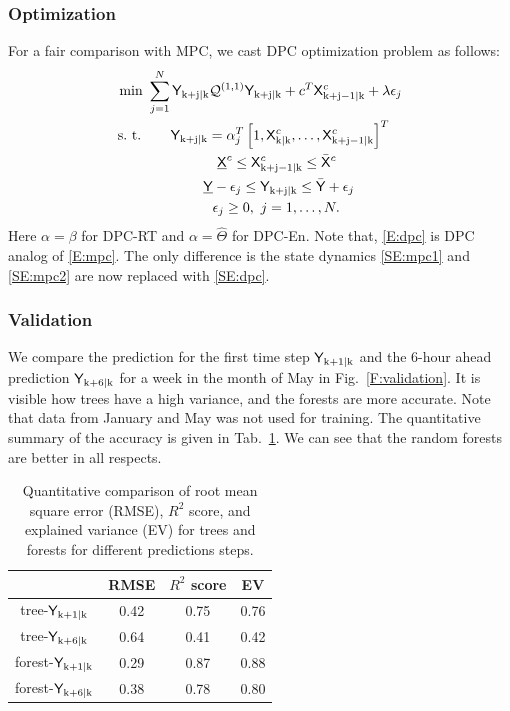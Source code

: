 \subsubsection{Optimization} 
\label{SSS:dpc_opt}
For a fair comparison with MPC, we cast DPC optimization problem as follows:
\begin{subequations}
\begin{align}
\text{min } & \sum_{j=1}^{N} {\mathsf{Y}}_{\mathrm{k+j|k}} \mathcal{Q}^{(1,1)} {\mathsf{Y}}_{\mathrm{k+j|k}} + c^T \mathsf{X}^c_{\mathrm{k+j-1|k}}+  \lambda\epsilon_j\\
\text{s.~t. } & \ \ \ \ \ \mathsf{Y}_{\mathrm{k+j|k}} =  \alpha_j^T \left[1,\mathsf{X}^c_{\mathrm{k|k}},\dots,\mathsf{X}^c_{\mathrm{k+j-1|k}} \right]^T \label{SE:dpc}\\
& \ \ \ \ \ \ \ \ \ \ \ \ \ \ \ \underline{\mathsf{X}}^c \leq \mathsf{X}^c_{\mathrm{k+j-1|k}} \leq \bar{\mathsf{X}}^c\\ 
& \ \ \ \ \ \ \ \ \ \ \ \ \underline{\mathsf{Y}}-\epsilon_j \leq \mathsf{Y}_{\mathrm{k+j|k}} \leq \bar{\mathsf{Y}} + \epsilon_j\\\
& \ \ \ \ \ \ \ \ \ \ \ \ \ \ \epsilon_j \geq 0, \ j = 1,\dots,N.
\end{align} \label{E:dpc}
\end{subequations}
\noindent Here $\alpha = \beta$ for DPC-RT and $\alpha = \hat{\Theta}$ for DPC-En.
Note that, \eqref{E:dpc} is DPC analog of \eqref{E:mpc}. The only difference is the state dynamics \eqref{SE:mpc1} and \eqref{SE:mpc2} are now replaced with \eqref{SE:dpc}.

\subsubsection{Validation} 
\label{SSS:dpc_val}

We compare the prediction for the first time step $\mathsf{Y}_{\mathrm{k+1|k}}$ and the 6-hour ahead prediction $\mathsf{Y}_{\mathrm{k+6|k}}$ for a week in the month of May in Fig.~\ref{F:validation}. It is visible how trees have a high variance, and the forests are more accurate. Note that data from January and May was not used for training. The quantitative summary of the accuracy is given in Tab.~\ref{T:validation}. We can see that the random forests are better in all respects.
\begin{table}[h!]
	\centering
	\caption{Quantitative comparison of root mean square error (RMSE), $R^2$ score, and explained variance (EV) for trees and forests for different predictions steps.}
	\captionsetup{justification=centering}
	\begin{tabular}{c|c|c|c}
		\toprule
		& RMSE & $R^2$ score & EV  \\ 
		\midrule
		tree-$\mathsf{Y}_{\mathrm{k+1|k}}$    &  0.42 &  0.75 & 0.76    \\
		tree-$\mathsf{Y}_{\mathrm{k+6|k}}$  & 0.64 &  0.41  & 0.42 \\
		forest-$\mathsf{Y}_{\mathrm{k+1|k}}$  & 0.29 & 0.87  & 0.88 \\
		forest-$\mathsf{Y}_{\mathrm{k+6|k}}$  & 0.38 & 0.78 & 0.80 \\
		\bottomrule
	\end{tabular}
	\label{T:validation}
\end{table}

